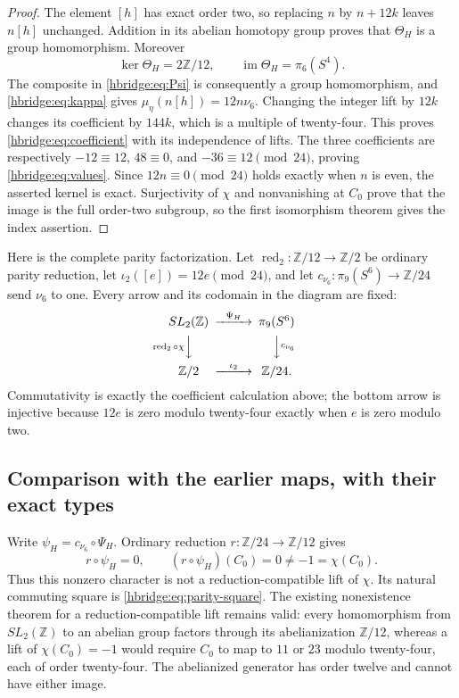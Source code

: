 \documentclass[11pt,letterpaper]{article}
\numberwithin{equation}{section}
\theoremstyle{definition}
\theoremstyle{remark}
\begin{document}
\begin{proof}
The element \([h]\) has exact order two, so replacing \(n\)
by \(n+12k\) leaves \(n[h]\) unchanged. Addition in its
abelian homotopy group proves that \(\Theta_H\) is a group
homomorphism. Moreover
\[
\ker\Theta_H=2\mathbb Z/12,
\qquad \operatorname{im}\Theta_H=\pi_6(S^4).
\]
The composite in \eqref{hbridge:eq:Psi} is consequently a
group homomorphism, and \eqref{hbridge:eq:kappa} gives
\(\mu_\eta(n[h])=12n\nu_6\). Changing the integer lift by
\(12k\) changes its coefficient by \(144k\), which is a
multiple of twenty-four. This proves
\eqref{hbridge:eq:coefficient} with its independence of lifts.
The three coefficients are respectively
\(-12\equiv12\), \(48\equiv0\), and
\(-36\equiv12\pmod{24}\), proving
\eqref{hbridge:eq:values}. Since \(12n\equiv0\pmod{24}\)
holds exactly when \(n\) is even, the asserted kernel is exact.
Surjectivity of \(\chi\) and nonvanishing at \(C_0\) prove
that the image is the full order-two subgroup, so the first
isomorphism theorem gives the index assertion.
\end{proof}

Here is the complete parity factorization. Let
\(\operatorname{red}_2:\mathbb Z/12\to\mathbb Z/2\) be
ordinary parity reduction, let
\(\iota_2([e])=12e\pmod{24}\), and let
\(c_{\nu_6}:\pi_9(S^6)\to\mathbb Z/24\) send \(\nu_6\)
to one. Every arrow and its codomain in the diagram are fixed:
\begin{equation}
\begin{CD}
SL_2(\mathbb Z) @>{\Psi_H}>> \pi_9(S^6)\\
@V{\operatorname{red}_2\circ\chi}VV @VV{c_{\nu_6}}V\\
\mathbb Z/2 @>{\iota_2}>> \mathbb Z/24.
\end{CD}
\label{hbridge:eq:parity-square}
\end{equation}
Commutativity is exactly the coefficient calculation above; the
bottom arrow is injective because \(12e\) is zero modulo
twenty-four exactly when \(e\) is zero modulo two.

\subsection{Comparison with the earlier maps, with their exact types}

Write \(\psi_H=c_{\nu_6}\circ\Psi_H\). Ordinary reduction
\(r:\mathbb Z/24\to\mathbb Z/12\) gives
\begin{equation}
r\circ\psi_H=0,
\qquad (r\circ\psi_H)(C_0)=0\ne-1=\chi(C_0).
\label{hbridge:eq:not-lift}
\end{equation}
Thus this nonzero character is not a reduction-compatible lift of
\(\chi\). Its natural commuting square is
\eqref{hbridge:eq:parity-square}. The existing nonexistence
theorem for a reduction-compatible lift remains valid: every
homomorphism from \(SL_2(\mathbb Z)\) to an abelian group
factors through its abelianization \(\mathbb Z/12\), whereas
a lift of \(\chi(C_0)=-1\) would require \(C_0\) to map
to \(11\) or \(23\) modulo twenty-four, each of order
twenty-four. The abelianized generator has order twelve and
cannot have either image.
\end{document}
